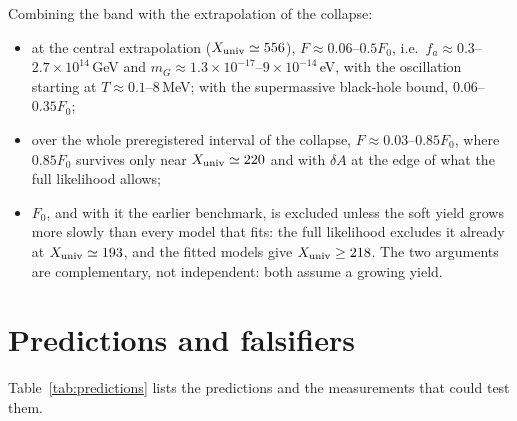 \documentclass[11pt,a4paper]{article}
\newcommand{\dA}{\delta A}
\newcommand{\Xu}{X_{\rm univ}}
\begin{document}
Combining the band with the extrapolation of the collapse:
\begin{itemize}
\item at the central extrapolation ($\Xu\simeq556$), $F\approx0.06$--$0.5F_0$, i.e.\ $f_a\approx0.3$--$2.7\times10^{14}$\,GeV and $m_G\approx1.3\times10^{-17}$--$9\times10^{-14}$\,eV, with the oscillation starting at $T\approx0.1$--$8$\,MeV; with the supermassive black-hole bound, $0.06$--$0.35F_0$;
\item over the whole preregistered interval of the collapse, $F\approx0.03$--$0.85F_0$, where $0.85F_0$ survives only near $\Xu\simeq220$ and with $\dA$ at the edge of what the full likelihood allows;
\item $F_0$, and with it the earlier benchmark, is excluded unless the soft yield grows more slowly than every model that fits: the full likelihood excludes it already at $\Xu\simeq193$, and the fitted models give $\Xu\ge218$. The two arguments are complementary, not independent: both assume a growing yield.
\end{itemize}

\section{Predictions and falsifiers}
\label{sec:predictions}

Table~\ref{tab:predictions} lists the predictions and the measurements that could test them.
\end{document}
